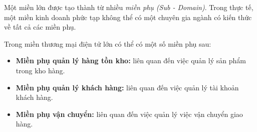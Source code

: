 Một miền  lớn được tạo thành từ nhiều \emph{miền phụ (Sub - Domain)}. Trong thực tế, một miền kinh doanh phức tạp không thể có một chuyên gia ngành có kiến thức về tất cả các miền phụ.

\begin{example} Trong miền thương mại điện tử lớn có thể có một số miền phụ sau:

\begin{itemize}

 




\item \textbf{Miền phụ quản lý hàng tồn kho:}  liên quan đến việc quản lý sản phẩm trong kho hàng.

\item \textbf{Miền phụ quản lý khách hàng:}  liên quan đến việc quản lý tài khoản khách hàng.

\item \textbf{Miền phụ vận chuyển:}  liên quan đến việc quản lý việc vận chuyển giao hàng.

\end{itemize}

\end{example}

